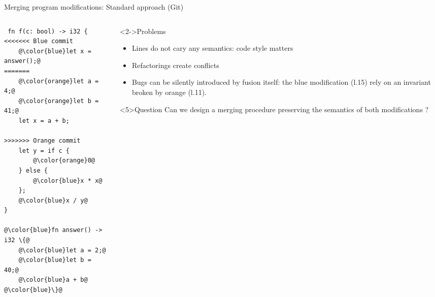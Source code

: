 \documentclass{beamer}
\begin{document}
\begin{frame}[fragile]{Merging program modifications: Standard approach (Git)}
\vspace{-1em}
\begin{columns}
\begin{column}{0.4\textwidth}
\vspace{0.5em}
\begin{lstlisting}
 fn f(c: bool) -> i32 {
<<<<<<< Blue commit
    @\color{blue}let x = answer();@
=======
    @\color{orange}let a = 4;@
    @\color{orange}let b = 41;@
    let x = a + b;

>>>>>>> Orange commit
    let y = if c {
        @\color{orange}0@
    } else {
        @\color{blue}x * x@
    };
    @\color{blue}x / y@
}

@\color{blue}fn answer() -> i32 \{@
    @\color{blue}let a = 2;@
    @\color{blue}let b = 40;@
    @\color{blue}a + b@
@\color{blue}\}@
\end{lstlisting}
\end{column}
\begin{column}{0.55\textwidth}
\begin{block}<2->{Problems}
\begin{itemize}
 \item<2-> Lines do not cary any semantics: code style matters
 \item<3-> Refactorings create conflicts
 \item<4-> Bugs can be silently introduced by fusion itself:
 the blue modification (l.15) rely on an invariant broken by orange (l.11).
\end{itemize}
\end{block}
\begin{alertblock}<5>{Question}
Can we design a merging procedure preserving the semantics of both modifications ?
\end{alertblock}
\end{column}
\end{columns}
\end{frame}
\end{document}
